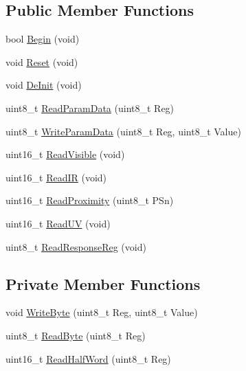 \subsection*{Public Member Functions}
\begin{DoxyCompactItemize}
\item 
bool \hyperlink{class_cool_s_i114_x_a206b36aca7049f63be1d11088c30a09f}{Begin} (void)
\item 
void \hyperlink{class_cool_s_i114_x_a9d9f9c9129c0c29ed497f8563f3dd823}{Reset} (void)
\item 
void \hyperlink{class_cool_s_i114_x_a6840abd53a2e3d71a6bb918077c6d6e6}{De\+Init} (void)
\item 
uint8\+\_\+t \hyperlink{class_cool_s_i114_x_a33cf431103c722442f6a0cc93848d640}{Read\+Param\+Data} (uint8\+\_\+t Reg)
\item 
uint8\+\_\+t \hyperlink{class_cool_s_i114_x_abf45eb10a6de1be16e68a51624fa2608}{Write\+Param\+Data} (uint8\+\_\+t Reg, uint8\+\_\+t Value)
\item 
uint16\+\_\+t \hyperlink{class_cool_s_i114_x_a42e0e574256341443c647a4c0eda87d5}{Read\+Visible} (void)
\item 
uint16\+\_\+t \hyperlink{class_cool_s_i114_x_abc536ee7ae8e3ba9d1069acc3889a2cf}{Read\+IR} (void)
\item 
uint16\+\_\+t \hyperlink{class_cool_s_i114_x_a194fede1105508c7803dbb567cbdcc67}{Read\+Proximity} (uint8\+\_\+t P\+Sn)
\item 
uint16\+\_\+t \hyperlink{class_cool_s_i114_x_a14ced664d74e93438440b0274109c111}{Read\+UV} (void)
\item 
uint8\+\_\+t \hyperlink{class_cool_s_i114_x_a869d3825147831d707f7ef324a665646}{Read\+Response\+Reg} (void)
\end{DoxyCompactItemize}
\subsection*{Private Member Functions}
\begin{DoxyCompactItemize}
\item 
void \hyperlink{class_cool_s_i114_x_ac5c8dc5ade604da7a1c8cd1586feefc2}{Write\+Byte} (uint8\+\_\+t Reg, uint8\+\_\+t Value)
\item 
uint8\+\_\+t \hyperlink{class_cool_s_i114_x_acc20f8037e156ec4aadcbe90780b1e8b}{Read\+Byte} (uint8\+\_\+t Reg)
\item 
uint16\+\_\+t \hyperlink{class_cool_s_i114_x_a1d25c9e137874af529804c2ec796a6b9}{Read\+Half\+Word} (uint8\+\_\+t Reg)
\end{DoxyCompactItemize}


